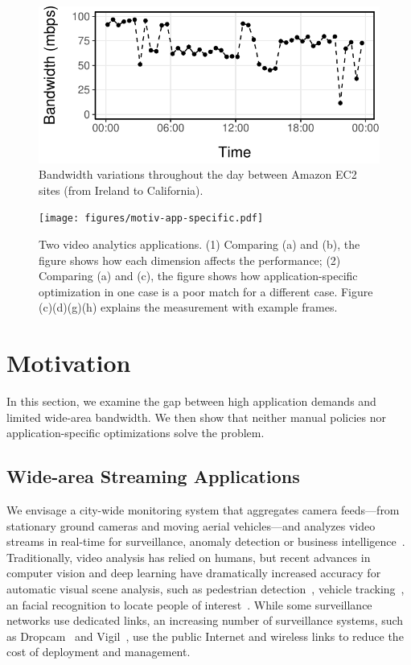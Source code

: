 \begin{figure}
  \centering
  \includegraphics[width=.9\linewidth]{figures/aws-variation.pdf}
  \caption{Bandwidth variations throughout the day between Amazon EC2 sites
    (from Ireland to California).}
  \label{fig:bw}
\end{figure}

\begin{figure}
  \centering
  \texttt{[image: figures/motiv-app-specific.pdf]}
  \caption{Two video analytics applications. (1) Comparing (a) and (b), the
    figure shows how each dimension affects the performance; (2) Comparing (a)
    and (c), the figure shows how application-specific optimization in one case
    is a poor match for a different case. Figure (c)(d)(g)(h) explains the
    measurement with example frames.}
  \label{fig:app-specific}
\end{figure}

\section{Motivation}
\label{sec:motivation}

In this section, we examine the gap between high application demands and limited
wide-area bandwidth. We then show that neither manual policies nor
application-specific optimizations solve the problem.

\subsection{Wide-area Streaming Applications}
\label{sec:wide-area-streaming}

 We envisage a city-wide monitoring system that
aggregates camera feeds---from stationary ground cameras and moving aerial
vehicles---and analyzes video streams in real-time for surveillance, anomaly
detection or business intelligence~\cite{oh2011large}. Traditionally, video
analysis has relied on humans, but recent advances in computer vision and deep
learning have dramatically increased accuracy for automatic visual scene analysis,
such as pedestrian detection~\cite{dollar2012pedestrian}, vehicle
tracking~\cite{coifman1998real}, an facial recognition to locate people of
interest~\cite{parkhi2015deep, Lu:2015:SHF:2888116.2888245}. While some
surveillance networks use dedicated links, an increasing number of surveillance
systems, such as Dropcam~\cite{dropcam} and Vigil~\cite{zhang2015design}, use
the public Internet and wireless links to reduce the cost of deployment and
management.

